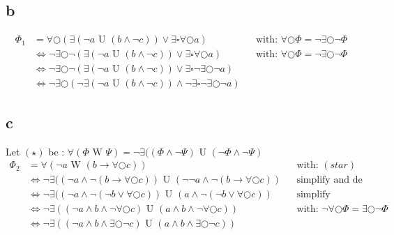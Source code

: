 \documentclass[11pt]{article}
\newcommand{\U}{\text{ U }}
\newcommand{\W}{\text{ W }}
\begin{document}
\subsection{b}
\begin{align*}
\Phi_1 &= \forall \bigcirc ( \exists ( \lnot a \U (b \land \lnot c)) \lor \exists \square \forall \bigcirc a) & & \text{with: } \forall\bigcirc\Phi =  \lnot\exists\bigcirc\lnot\Phi\\
&\Leftrightarrow  \lnot \exists \bigcirc \lnot ( \exists ( \lnot a \U (b \land \lnot c)) \lor \exists \square \forall \bigcirc a) & & \text{with: } \forall\bigcirc\Phi =  \lnot\exists\bigcirc\lnot\Phi\\
&\Leftrightarrow \lnot \exists \bigcirc \lnot ( \exists ( \lnot a \U (b \land \lnot c)) \lor \exists \square \lnot \exists\bigcirc \lnot a)\\
&\Leftrightarrow \lnot \exists \bigcirc  ( \lnot \exists ( \lnot a \U (b \land \lnot c)) \land \lnot\exists \square \lnot \exists\bigcirc \lnot a)
\end{align*}

\subsection{c}
Let $(\star)$ be : $\forall(\Phi \W \Psi) = \lnot \exists ((\Phi \land \lnot \Psi) \U (\lnot \Phi \land \lnot \Psi)$
\begin{align*}
	\Phi_2 &= \forall ( \lnot a \W (b \rightarrow \forall \bigcirc c)) & & \text{with: } (star) \\	
	&\Leftrightarrow \lnot \exists ((\lnot a \land \lnot (b \rightarrow \forall \bigcirc c)) \U (\lnot \lnot a \land \lnot (b \rightarrow \forall \bigcirc c)) & & \text{simplify and de Morgan} \\
	&\Leftrightarrow \lnot \exists ((\lnot a \land \lnot (\lnot b \lor \forall \bigcirc c)) \U (a \land \lnot (\lnot b \lor \forall \bigcirc c)) & & \text{simplify}\\
	&\Leftrightarrow \lnot \exists ((\lnot a \land b \land \lnot\forall \bigcirc c) \U (a \land b \land \lnot \forall \bigcirc c)) & & \text{with: } \lnot \forall \bigcirc \Phi = \exists \bigcirc \lnot \Phi\\
	&\Leftrightarrow \lnot \exists ((\lnot a \land b \land \exists \bigcirc \lnot c) \U (a \land b \land \exists \bigcirc \lnot c)) & & \\
\end{align*}
	
\end{document}
